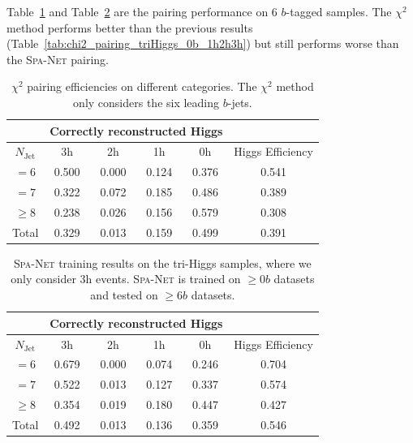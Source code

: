 \documentclass[12pt]{article}
\begin{document}
	Table~\ref{tab:chi2_pairing_triHiggs_6b_3h} and Table~\ref{tab:SPANet_triHiggs_6b_3h} are the pairing performance on 6 $b$-tagged samples. The $\chi^2$ method performs better than the previous results (Table~\ref{tab:chi2_pairing_triHiggs_0b_1h2h3h}) but still performs worse than the \textsc{Spa-Net} pairing.
	\begin{table}[htpb]
		\centering
		\caption{$\chi^2$ pairing efficiencies on different categories. The $\chi^2$ method only considers the six leading $b$-jets.}
		\label{tab:chi2_pairing_triHiggs_6b_3h}
		\begin{tabular}{c|cccc|c}
			\multicolumn{1}{l|}{} & \multicolumn{4}{c|}{Correctly reconstructed Higgs} & \multicolumn{1}{l}{} \\ \hline
			$N_\text{Jet}$        & 3h          & 2h         & 1h         & 0h         & Higgs Efficiency     \\ \hline
			$=6$                  & 0.500       & 0.000      & 0.124      & 0.376      & 0.541                \\
			$=7$                  & 0.322       & 0.072      & 0.185      & 0.486      & 0.389                \\
			$\ge 8$               & 0.238       & 0.026      & 0.156      & 0.579      & 0.308                \\ \hline
			Total                 & 0.329       & 0.013      & 0.159      & 0.499      & 0.391               
		\end{tabular}
	\end{table}
	\begin{table}[htpb]
		\centering
		\caption{\textsc{Spa-Net} training results on the tri-Higgs samples, where we only consider 3h events. \textsc{Spa-Net} is trained on $\ge 0b$ datasets and tested on $\ge 6b$ datasets.}
		\label{tab:SPANet_triHiggs_6b_3h}
		\begin{tabular}{c|cccc|c}
			\multicolumn{1}{l|}{} & \multicolumn{4}{c|}{Correctly reconstructed Higgs} & \multicolumn{1}{l}{} \\ \hline
			$N_\text{Jet}$        & 3h          & 2h         & 1h         & 0h         & Higgs Efficiency     \\ \hline
			$=6$                  & 0.679       & 0.000      & 0.074      & 0.246      & 0.704                \\
			$=7$                  & 0.522       & 0.013      & 0.127      & 0.337      & 0.574                \\
			$\ge 8$               & 0.354       & 0.019      & 0.180      & 0.447      & 0.427                \\ \hline
			Total                 & 0.492       & 0.013      & 0.136      & 0.359      & 0.546               
		\end{tabular}
	\end{table}
\end{document}
